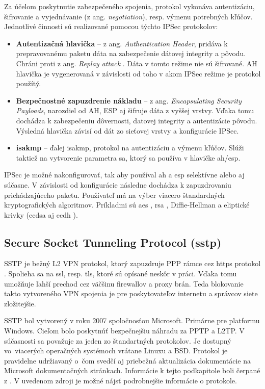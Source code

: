 Za účelom poskytnutie zabezpečeného spojenia, protokol vykonáva autentizáciu, šifrovanie a vyjednávanie (z ang. \textit{negotiation}), resp. výmenu potrebných kľúčov. Jednotlivé činnosti sú realizované pomocou týchto IPSec protokolov:
\begin{itemize}
	\item{\textbf{Autentizačná hlavička}} -- z ang. \textit{Authentication Header}, pridáva k prepravovanému paketu dáta na zabezpečenie dátovej integrity a pôvodu. Chráni proti z ang. \textit{Replay attack} \cite{repa}. Dáta v tomto režime nie sú šifrované. AH hlavička je vygenerovaná v závislosti od toho v akom IPSec režime je protokol použítý.    
	\item{\textbf{Bezpečnostné zapuzdrenie nákladu}} -- z ang. \textit{Encapsulating Security Payloads}, narozdiel od AH, ESP aj šifruje dáta z vyššej vrstvy. Vďaka tomu dochádza k zabezpečeniu dôvernosti, datovej integrity a autentizácie pôvodu. Výsledná hlavička závisí od dát zo sieťovej vrstvy a konfigurácie IPSec.    
	\item{\textbf{\acrlong{isakmp}}} -- ďalej \acrshort{isakmp}, protokol na autentizáciu a výmenu kľúčov. Slúži taktiež na vytvorenie parametra \acrshort{sa}, ktorý sa používa v hlavičke \acrshort{ah}/\acrshort{esp}.
\end{itemize}

IPSec je možné nakonfigurovať, tak aby používal \acrshort{ah} a \acrshort{esp} selektívne alebo aj súčasne. V závislosti od konfigurácie následne dochádza k zapuzdrovaniu prichádzajúceho paketu. Používateľ má na výber viacero štandardných kryptografických algoritmov. Príkladmi sú \acrshort{aes} \cite{aes}, \acrshort{rsa} \cite{rsa}, Diffie-Hellman \cite{dh} a  eliptické krivky (\acrshort{ecdsa} \cite{ecdsa} aj \acrshort{ecdh} \cite{ecdh}).

\subsection{Secure Socket Tunneling Protocol (\acrshort{sstp})}
SSTP je bežný L2 VPN protokol, ktorý zapuzdruje PPP rámce cez \acrshort{https} protokol \cite{https}. Spolieha sa na \acrshort{ssl}, resp. \acrshort{tls}, ktoré sú opísané neskôr v práci. Vďaka tomu umožňuje ľahší prechod cez väčšinu firewallov a proxy brán. Teda blokovanie takto vytvoreného VPN spojenia je pre poskytovateľov internetu a správcov siete zložitejšie. 

SSTP bol vytvorený v roku 2007 spoločnosťou Microsoft. Primárne pre platformu Windows. Cieľom bolo poskytnúť bezpečnejšiu náhradu za PPTP a L2TP. V súčasnosti sa považuje za jeden zo štandartných protokolov. Je dostupný vo~viacerých operačných systémoch vrátane Linuxu a BSD. Protokol je pravidelne udržiavaný o~čom svedčí aj priebežná aktualizácia dokumentácie na Microsoft dokumentačných stránkach. Informácie k tejto podkapitole boli čerpané z \cite{mssstp}. V uvedenom zdroji je možné nájsť podrobnejšie informácie o protokole. 

